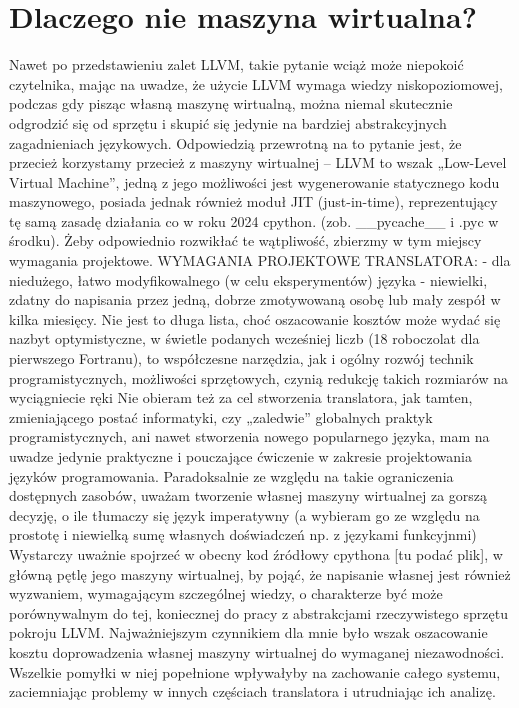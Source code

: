 \section{Dlaczego nie maszyna wirtualna?}
Nawet po przedstawieniu zalet LLVM, takie pytanie wciąż może niepokoić czytelnika, mając na uwadze, że użycie LLVM wymaga wiedzy niskopoziomowej, podczas gdy pisząc własną maszynę wirtualną, można niemal skutecznie odgrodzić się od sprzętu i skupić się jedynie na bardziej abstrakcyjnych zagadnieniach językowych. 
Odpowiedzią przewrotną na to pytanie jest, że przecież korzystamy przecież z maszyny wirtualnej – LLVM to wszak „Low-Level Virtual Machine”, jedną z jego możliwości jest wygenerowanie statycznego kodu maszynowego, posiada jednak również moduł JIT (just-in-time), reprezentujący tę samą zasadę działania co w roku 2024 cpython. (zob. \_\_pycache\_\_ i .pyc w środku). Żeby odpowiednio rozwikłać te wątpliwość, zbierzmy w tym miejscy wymagania projektowe.
WYMAGANIA PROJEKTOWE TRANSLATORA:
- dla niedużego, łatwo modyfikowalnego (w celu eksperymentów) języka
- niewielki, zdatny do napisania przez jedną, dobrze zmotywowaną osobę lub mały zespół w kilka miesięcy.
Nie jest to długa lista, choć oszacowanie kosztów może wydać się nazbyt optymistyczne, w świetle podanych wcześniej liczb (18 roboczolat dla pierwszego Fortranu), to współczesne narzędzia, jak i ogólny rozwój technik programistycznych, możliwości sprzętowych, czynią redukcję takich rozmiarów na wyciągniecie ręki Nie obieram też za cel stworzenia translatora, jak tamten, zmieniającego postać informatyki, czy „zaledwie” globalnych praktyk programistycznych, ani nawet stworzenia nowego popularnego języka, mam na uwadze jedynie praktyczne i pouczające ćwiczenie w zakresie projektowania języków programowania.
Paradoksalnie ze względu na takie ograniczenia dostępnych zasobów, uważam tworzenie własnej maszyny wirtualnej za gorszą decyzję, o ile tłumaczy się język imperatywny (a wybieram go ze względu na prostotę i niewielką sumę własnych doświadczeń np. z językami funkcyjnmi) Wystarczy uważnie spojrzeć w obecny kod źródłowy cpythona [tu podać plik], w główną pętlę jego maszyny wirtualnej, by pojąć, że napisanie własnej jest również wyzwaniem, wymagającym szczególnej wiedzy, o charakterze być może porównywalnym do tej, koniecznej do pracy z abstrakcjami rzeczywistego sprzętu pokroju LLVM. Najważniejszym czynnikiem dla mnie było wszak oszacowanie kosztu doprowadzenia własnej maszyny wirtualnej do wymaganej niezawodności. Wszelkie pomyłki w niej popełnione wpływałyby na zachowanie całego systemu, zaciemniając problemy w innych częściach translatora i utrudniając ich analizę. 
